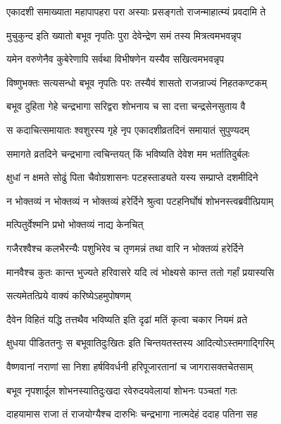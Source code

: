 \twolineshloka
{एकादशी समाख्याता महापापहरा परा}
{अस्याः प्रसङ्गतो राजन्माहात्म्यं प्रवदामि ते}%

\twolineshloka
{मुचुकुन्द इति ख्यातो बभूव नृपतिः पुरा}
{देवेन्द्रेण समं तस्य मित्रत्वमभवन्नृप}%

\twolineshloka
{यमेन वरुणेनैव कुबेरेणापि सर्वथा}
{विभीषणेन यस्यैव सखित्वमभवन्नृप}%

\twolineshloka
{विष्णुभक्तः सत्यसन्धो बभूव नृपतिः परः}
{तस्यैवं शासतो राजन्राज्यं निहतकण्टकम्}%

\twolineshloka
{बभूव दुहिता गेहे चन्द्रभागा सरिद्वरा}
{शोभनाय च सा दत्ता चन्द्रसेनसुताय वै}%

\twolineshloka
{स कदाचित्समायातः श्वशुरस्य गृहे नृप}
{एकादशीव्रतदिनं समायातं सुपुण्यदम् }%

\twolineshloka
{समागते व्रतदिने चन्द्रभागा त्वचिन्तयत्}
{किं भविष्यति देवेश मम भर्तातिदुर्बलः}%

\twolineshloka
{क्षुधां न क्षमते सोढुं पिता चैवोग्रशासनः}
{पटहस्ताड्यते यस्य सम्प्राप्ते दशमीदिने}%

\twolineshloka
{न भोक्तव्यं न भोक्तव्यं न भोक्तव्यं हरेर्दिने}
{श्रुत्वा पटहनिर्घोषं शोभनस्त्वब्रवीत्प्रियाम्}%

\onelineshloka
{मत्पितुर्वेश्मनि प्रभो भोक्तव्यं नाद्य केनचित्}%

\twolineshloka
{गजैरश्वैश्च कलभैरन्यैः पशुभिरेव  च}
{तृणमन्नं तथा वारि न भोक्तव्यं हरेर्दिने}%

\twolineshloka
{मानवैश्च कुतः कान्त भुज्यते हरिवासरे}
{यदि त्वं भोक्ष्यसे कान्त ततो गर्हां प्रयास्यसि}%

\onelineshloka
{सत्यमेतत्प्रिये वाक्यं करिष्येऽहमुपोषणम्}%

\twolineshloka
{दैवेन विहितं यद्धि तत्तथैव भविष्यति}
{इति दृढां मतिं कृत्वा चकार नियमं व्रते}%

\twolineshloka
{क्षुधया पीडिततनुः स बभूवातिदुःखितः}
{इति चिन्तयतस्तस्य आदित्योऽस्तमगाद्गिरिम्}%

\twolineshloka
{वैष्णवानां नराणां सा निशा हर्षविवर्धनी}
{हरिपूजारतानां च जागरासक्तचेतसाम्}%

\twolineshloka
{बभूव नृपशार्दूल शोभनस्यातिदुःखदा}
{रवेरुदयवेलायां शोभनः पञ्चतां गतः}%

\twolineshloka
{दाहयामास राजा तं राजयोग्यैश्च दारुभिः}
{चन्द्रभागा नात्मदेहं ददाह पतिना सह}%

